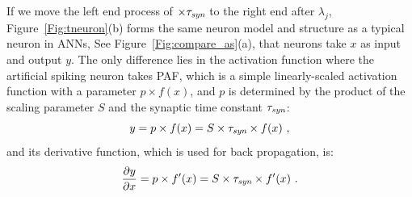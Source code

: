 \documentclass{article}
\begin{document}
	If we move the left end process of $\times \tau_{\textit{\textrm{syn}}}$ to the right end after $\lambda_j$, Figure~\ref{Fig:tneuron}(b) forms the same neuron model and structure as a typical neuron in ANNs, See Figure~\ref{Fig:compare_as}(a), that neurons take $x$ as input and output $y$.
	The only difference lies in the activation function where the artificial spiking neuron takes PAF, which is a simple linearly-scaled activation function with a parameter $p\times f(x)$, and $p$ is determined by the product of the scaling parameter $S$ and the synaptic time constant $\tau_{\textit{\textrm{syn}}}$:
	\begin{equation}
	y = p \times f(x) = S \times \tau_{\textit{\textrm{syn}}} \times f(x)~,
	\label{equ:PAF}
	\end{equation}
	and its derivative function, which is used for back propagation, is:
	\begin{equation}
	\frac{\partial y}{\partial x} = p \times f'(x) = S \times \tau_{\textit{\textrm{syn}}} \times f'(x)~.
	\end{equation}
	
\end{document}
